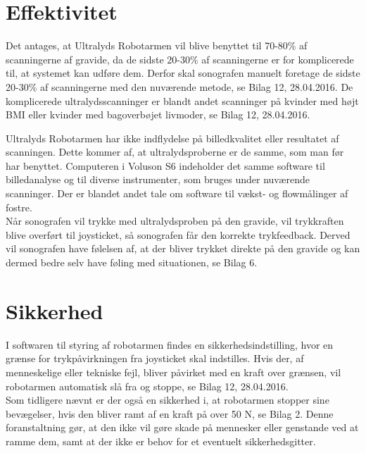 \section{Effektivitet}
Det antages, at Ultralyds Robotarmen vil blive benyttet til 70-80\% af scanningerne af gravide, da de sidste 20-30\% af scanningerne er for komplicerede til, at systemet kan udføre dem. Derfor skal sonografen manuelt foretage de sidste 20-30\% af scanningerne med den nuværende metode, se Bilag 12, 28.04.2016. De komplicerede ultralydsscanninger er blandt andet scanninger på kvinder med højt BMI eller kvinder med bagoverbøjet livmoder, se Bilag 12, 28.04.2016. 
 
Ultralyds Robotarmen har ikke indflydelse på billedkvalitet eller resultatet af scanningen. Dette kommer af, at ultralydsproberne er de samme, som man før har benyttet. Computeren i Voluson S6 indeholder det samme software til billedanalyse og til diverse instrumenter, som bruges under nuværende scanninger. Der er blandet andet tale om software til vækst- og flowmålinger af fostre. \\
Når sonografen vil trykke med ultralydsproben på den gravide, vil trykkraften blive overført til joysticket, så sonografen får den korrekte trykfeedback. Derved vil sonografen have følelsen af, at der bliver trykket direkte på den gravide og kan dermed bedre selv have føling med situationen, se Bilag 6. 

\section{Sikkerhed}
I softwaren til styring af robotarmen findes en sikkerhedsindstilling, hvor en grænse for trykpåvirkningen fra joysticket skal indstilles. Hvis der, af menneskelige eller tekniske fejl, bliver påvirket med en kraft over grænsen, vil robotarmen automatisk slå fra og stoppe, se Bilag 12, 28.04.2016. \\
Som tidligere nævnt er der også en sikkerhed i, at robotarmen stopper sine bevægelser, hvis den bliver ramt af en kraft på over 50 N, se Bilag 2. Denne foranstaltning gør, at den ikke vil gøre skade på mennesker eller genstande ved at ramme dem, samt at der ikke er behov for et eventuelt sikkerhedsgitter. 

